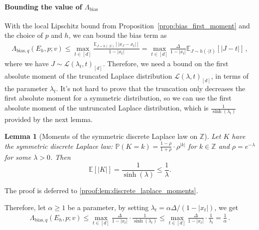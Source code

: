 \documentclass{article}
\theoremstyle{plain}
\newtheorem{lemma}[theorem]{Lemma}
\theoremstyle{definition}
\theoremstyle{plain}
\newcommand{\E}{\mathbb E}
\newcommand{\Z}{\mathbb Z}
\newcommand{\PP}{\mathbb P}
\newcommand{\cL}{\mathcal L}
\begin{document}
\paragraph{Bounding the value of $\Lambda_{\textrm{bias}}$}
With the local Lipschitz bound from Proposition~\ref{prop:bias_first_moment}
and the choice of $p$ and $h$, we can bound the bias term as
\begin{align}
    \Lambda_{\mathrm{bias}, q}(E_h, p ; v)
    \le \max_{t\in[d]}\frac{\E_{J\sim h(\cdot|t)}\left[|x_J-x_t|\right]}{1-|x_t|}
    = \max_{t\in[d]}\frac{\Delta}{1-|x_t|}\E_{J\sim h(\cdot|t)}\left[|J-t|\right]\,,
\end{align}
where we have $J \sim \cL(\lambda_t, t)_{[d]}$.
Therefore, we need a bound on the first absolute moment of the truncated Laplace distribution $\cL(\lambda, t)_{[d]}$,
in terms of the parameter $\lambda_t$.
It's not hard to prove that the truncation only decreases the first absolute moment for a symmetric distribution, so we can use the first absolute moment of the untruncated Laplace distribution, which is $\frac{1}{\sinh(\lambda_t)}$ provided by the next lemma.
\begin{lemma}[Moments of the symmetric discrete Laplace law on $\Z$]
    \label{lem:discrete_laplace_moments}
    Let $K$ have the symmetric discrete Laplace law:
    $\PP(K=k) = \frac{1-\rho}{1+\rho} \cdot \rho^{|k|}$ for $k\in\Z$ and $\rho = e^{-\lambda}$ for some $\lambda > 0$.
    Then
    \begin{equation}
        \E\left[|K|\right] = \frac{1}{\sinh(\lambda)} \le \frac{1}{\lambda}.
        \label{eq:laplace_abs_moment}
    \end{equation}
\end{lemma}
\noindent The proof is deferred to \ref{proof:lem:discrete_laplace_moments}.

Therefore, let $\alpha \ge 1$ be a parameter,
by setting $\lambda_t = \alpha\Delta/(1-|x_t|)$, we get
\begin{align}
    \Lambda_{\mathrm{bias}, q}(E_h, p ; v)
    \le \max_{t\in[d]}\frac{\Delta}{1-|x_t|}\cdot \frac{1}{\sinh(\lambda_t)}
    \le \max_{t\in[d]}\frac{\Delta}{1-|x_t|}\cdot \frac{1}{\lambda_t}
    = \frac{1}{\alpha}\,.
\end{align}
\end{document}
